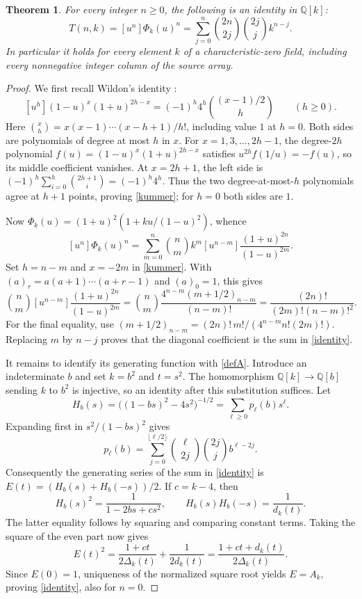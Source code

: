 \documentclass[11pt]{article}
\newtheorem{theorem}{Theorem}
\begin{document}
\begin{theorem}\label{main}
For every integer $n\geq0$, the following is an identity in $\mathbb Q[k]$:
\begin{equation}\label{identity}
 T(n,k)=[u^n]\Phi_k(u)^n
 =\sum_{j=0}^n\binom{2n}{2j}\binom{2j}{j}k^{n-j}.
\end{equation}
In particular it holds for every element $k$ of a characteristic-zero
field, including every nonnegative integer column of the source array.
\end{theorem}

\begin{proof}
We first recall Wildon's identity \cite{wildon}:
\begin{equation}\label{kummer}
 [u^h](1-u)^x(1+u)^{2h-x}
   =(-1)^h4^h\binom{(x-1)/2}{h}\qquad(h\geq0).
\end{equation}
Here $\binom{x}{h}=x(x-1)\cdots(x-h+1)/h!$, including value $1$
at $h=0$. Both sides are polynomials of degree at most $h$ in $x$.
For $x=1,3,\ldots,2h-1$, the degree-$2h$ polynomial
$f(u)=(1-u)^x(1+u)^{2h-x}$ satisfies
$u^{2h}f(1/u)=-f(u)$, so its middle coefficient vanishes.
At $x=2h+1$, the left side is
$(-1)^h\sum_{i=0}^h\binom{2h+1}{i}=(-1)^h4^h$.
Thus the two degree-at-most-$h$ polynomials agree at $h+1$ points,
proving \eqref{kummer}; for $h=0$ both sides are $1$.

Now $\Phi_k(u)=(1+u)^2(1+ku/(1-u)^2)$, whence
\begin{equation}\label{transformed}
 [u^n]\Phi_k(u)^n=
 \sum_{m=0}^n\binom nm k^m
 [u^{n-m}]\frac{(1+u)^{2n}}{(1-u)^{2m}}.
\end{equation}
Set $h=n-m$ and $x=-2m$ in \eqref{kummer}.
With $(a)_r=a(a+1)\cdots(a+r-1)$ and $(a)_0=1$, this gives
\[
 \binom nm[u^{n-m}]\frac{(1+u)^{2n}}{(1-u)^{2m}}
 =\binom nm\frac{4^{n-m}(m+1/2)_{n-m}}{(n-m)!}
 =\frac{(2n)!}{(2m)!(n-m)!^2}.
\]
For the final equality, use
$(m+1/2)_{n-m}=(2n)!\,m!/(4^{n-m}n!(2m)!)$.
Replacing $m$ by $n-j$ proves that the diagonal coefficient is the
sum in \eqref{identity}.

It remains to identify its generating function with \eqref{defA}.
Introduce an indeterminate $b$ and set $k=b^2$ and $t=s^2$.
The homomorphism $\mathbb Q[k]\longrightarrow\mathbb Q[b]$ sending
$k$ to $b^2$ is injective, so an identity after this substitution suffices.
Let
\[
 H_b(s)=\big((1-bs)^2-4s^2\big)^{-1/2}
       =\sum_{\ell\geq0}p_\ell(b)s^\ell.
\]
Expanding first in $s^2/(1-bs)^2$ gives
\[
 p_\ell(b)=\sum_{j=0}^{\lfloor\ell/2\rfloor}
        \binom{\ell}{2j}\binom{2j}{j}b^{\ell-2j}.
\]
Consequently the generating series of the sum in \eqref{identity} is
$E(t)=(H_b(s)+H_b(-s))/2$. If $c=k-4$, then
\[
 H_b(s)^2=\frac1{1-2bs+cs^2},\qquad
 H_b(s)H_b(-s)=\frac1{d_k(t)}.
\]
The latter equality follows by squaring and comparing constant terms.
Taking the square of the even part now gives
\[
 E(t)^2=\frac{1+ct}{2\Delta_k(t)}+\frac1{2d_k(t)}
       =\frac{1+ct+d_k(t)}{2\Delta_k(t)}.
\]
Since $E(0)=1$, uniqueness of the normalized square root yields
$E=A_k$, proving \eqref{identity}, also for $n=0$.
\end{proof}
\end{document}
